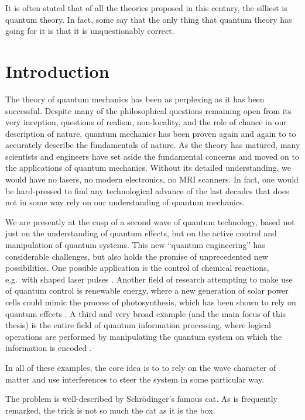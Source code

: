 \begin{savequote}[75mm]
It is often stated that of all the theories proposed in this century, the
silliest is quantum theory. In fact, some say that the only thing that quantum
theory has going for it is that it is unquestionably correct.
\end{savequote}

\chapter{Introduction}
\label{chap:introduction}

The theory of quantum mechanics has been as perplexing as it has been
successful. Despite many of the philosophical questions remaining open from its
very inception, questions of realism, non-locality, and the role of chance in
our description of nature, quantum mechanics has been proven again and again to
to accurately describe the fundamentals of nature. As the theory has matured,
many scientists and engineers have set aside the fundamental concerns and moved
on to the applications of quantum mechanics. Without its detailed understanding,
we would have no lasers, no modern electronics, no MRI scanners. In fact, one
would be hard-pressed to find any technological advance of the last decades that
does not in some way rely on our understanding of quantum mechanics.

We are presently at the cusp of a second wave of quantum technology, based not
just on the understanding of quantum effects, but on the active control and
manipulation of quantum systems. This new ``quantum engineering'' has
considerable challenges, but also holds the promise of unprecedented new
possibilities. One possible application is the control of chemical
reactions, e.g.\ with shaped laser pulses \cite{BrumerShapiro}.
Another field of research attempting to make use of quantum control is renewable
energy, where a new generation of solar power cells could mimic the process of
photosynthesis, which has been shown to rely on quantum effects
\cite{ColliniScience09, SarovarNatPhys10}.  A third and very broad example (and
the main focus of this thesis) is the entire field of quantum information
processing, where logical operations are performed by manipulating the quantum
system on which the information is encoded \cite{NielsenChuang}.

In all of these examples, the core idea is to to rely on the wave character
of matter and use interferences to steer the system in some particular way.



The problem is well-described by Schrödinger's famous cat.
As is frequently remarked, the trick is not so much the cat as it is the box.

